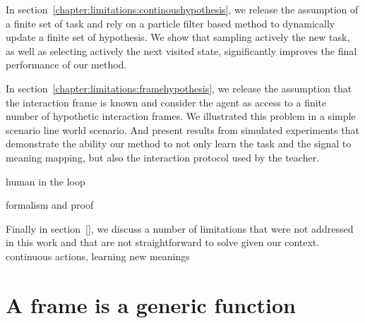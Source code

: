In section~\ref{chapter:limitations:continoushypothesis}, we release the assumption of a finite set of task and rely on a particle filter based method to dynamically update a finite set of hypothesis. We show that sampling actively the new task, as well as selecting actively the next visited state, significantly improves the final performance of our method.

In section~\ref{chapter:limitations:framehypothesis}, we release the assumption that the interaction frame is known and consider the agent as access to a finite number of hypothetic interaction frames. We illustrated this problem in a simple scenario line world scenario. And present results from simulated experiments that demonstrate the ability our method to not only learn the task and the signal to meaning mapping, but also the interaction protocol used by the teacher.

human in the loop

formalism and proof


Finally in section~\ref{}, we discuss a number of limitations that were not addressed in this work and that are not straightforward to solve given our context. continuous actions, learning new meanings





% 

\section{A frame is a generic function}
\label{chapter:limitations:framegeneric}

